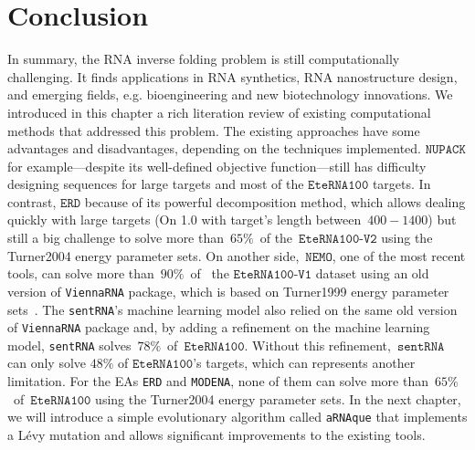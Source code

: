 \section{Conclusion}
In summary, the RNA inverse folding problem is still computationally challenging. It finds applications in RNA synthetics, RNA nanostructure design, and emerging fields, e.g. bioengineering and new biotechnology innovations. We introduced in this chapter a rich literation review of existing computational methods that addressed this problem. The existing approaches have some advantages and disadvantages, depending on the techniques implemented. \(\texttt{NUPACK}\) for example---despite its well-defined objective function---still has difficulty designing sequences for large targets and most of the \(\texttt{EteRNA100}\) targets. In contrast, \(\texttt{ERD}\) because of its powerful decomposition method, which allows dealing quickly with large targets (On  1.0 with target's length between~\(400-1400\)) but still a big challenge to solve more than~\(65\%\)~of the~\(\texttt{EteRNA100-V2}\) using the Turner2004 energy parameter sets. On another side,~\(\texttt{NEMO}\), one of the most recent tools, can solve more than~\(90\%\)~of~ the \(\texttt{EteRNA100-V1}\) dataset using an old version of \texttt{ViennaRNA} package, which is based on Turner1999 energy parameter sets~\cite{Turn1999}. The \texttt{sentRNA}'s machine learning model also relied on the same old version of \texttt{ViennaRNA} package and, by adding a refinement on the machine learning model, \texttt{sentRNA} solves~\(78\%\)~of~\(\texttt{EteRNA100}\). Without this refinement,~\(\texttt{sentRNA}\) can only solve \(48\%\) of \(\texttt{EteRNA100}\)'s targets, which can represents another limitation. For the EAs \texttt{ERD} and \texttt{MODENA}, none of them can solve more than~\(65\%\)~of~\(\texttt{EteRNA100}\) using the Turner2004 energy parameter sets.  In the next chapter, we will introduce a simple evolutionary algorithm called \texttt{aRNAque} that implements a Lévy mutation and allows significant improvements to the existing tools.
